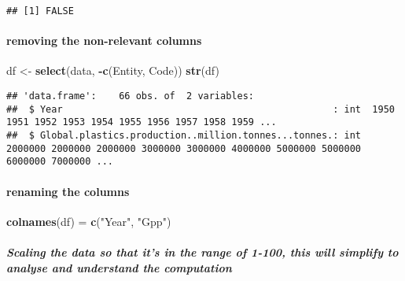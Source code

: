 \documentclass[
]{article}
\newenvironment{Shaded}{\begin{snugshade}}{\end{snugshade}}
\newcommand{\DataTypeTok}[1]{\textcolor[rgb]{0.13,0.29,0.53}{#1}}
\newcommand{\DecValTok}[1]{\textcolor[rgb]{0.00,0.00,0.81}{#1}}
\newcommand{\KeywordTok}[1]{\textcolor[rgb]{0.13,0.29,0.53}{\textbf{#1}}}
\newcommand{\NormalTok}[1]{#1}
\newcommand{\OperatorTok}[1]{\textcolor[rgb]{0.81,0.36,0.00}{\textbf{#1}}}
\newcommand{\StringTok}[1]{\textcolor[rgb]{0.31,0.60,0.02}{#1}}
\begin{document}
\begin{verbatim}
## [1] FALSE
\end{verbatim}

\hypertarget{removing-the-non-relevant-columns}{%
\paragraph{removing the non-relevant
columns}\label{removing-the-non-relevant-columns}}

\begin{Shaded}
\begin{Highlighting}[]
\NormalTok{df \textless{}{-}}\StringTok{ }\KeywordTok{select}\NormalTok{(data, }\OperatorTok{{-}}\KeywordTok{c}\NormalTok{(Entity, Code))}
\KeywordTok{str}\NormalTok{(df)}
\end{Highlighting}
\end{Shaded}

\begin{verbatim}
## 'data.frame':    66 obs. of  2 variables:
##  $ Year                                                : int  1950 1951 1952 1953 1954 1955 1956 1957 1958 1959 ...
##  $ Global.plastics.production..million.tonnes...tonnes.: int  2000000 2000000 2000000 3000000 3000000 4000000 5000000 5000000 6000000 7000000 ...
\end{verbatim}

\hypertarget{renaming-the-columns}{%
\paragraph{renaming the columns}\label{renaming-the-columns}}

\begin{Shaded}
\begin{Highlighting}[]
\KeywordTok{colnames}\NormalTok{(df) =}\StringTok{ }\KeywordTok{c}\NormalTok{(}\StringTok{"Year"}\NormalTok{, }\StringTok{"Gpp"}\NormalTok{)}
\end{Highlighting}
\end{Shaded}

\hypertarget{scaling-the-data-so-that-its-in-the-range-of-1-100-this-will-simplify-to-analyse-and-understand-the-computation}{%
\subparagraph{Scaling the data so that it's in the range of 1-100, this
will simplify to analyse and understand the
computation}\label{scaling-the-data-so-that-its-in-the-range-of-1-100-this-will-simplify-to-analyse-and-understand-the-computation}}

\begin{Shaded}
\end{Shaded}
\end{document}
